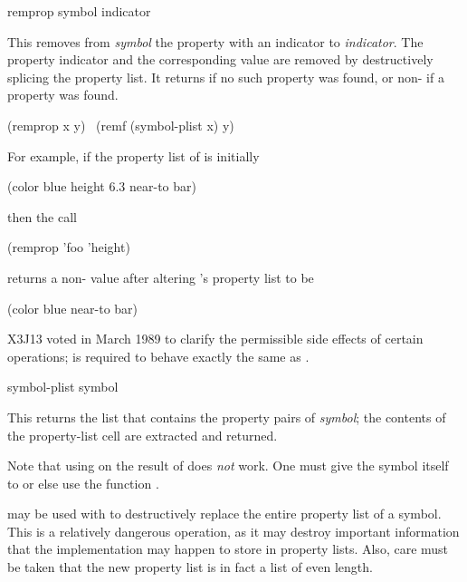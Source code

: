 \begin{defun}[Function]
remprop symbol indicator

This removes from \emph{symbol} the property with an indicator 
to \emph{indicator}.  The property indicator and the corresponding
value are removed by destructively splicing the property
list.  It returns {\false} if no such property was found,
or non-{\false} if a property was found.
\begin{lisp}
(remprop x y) \EQ\ (remf (symbol-plist x) y)
\end{lisp}
For example, if the property list of  is initially
\begin{lisp}
(color blue height 6.3 near-to bar)
\end{lisp}
then the call
\begin{lisp}
(remprop 'foo 'height)
\end{lisp}
returns a non-{\nil} value after altering 's property list to be
\begin{lisp}
(color blue near-to bar)
\end{lisp}

\begin{newer}
X3J13 voted in March 1989 
to clarify the permissible side effects of certain operations;
is required to behave exactly the same as
.
\end{newer}
\end{defun}

\begin{defun}[Function]
symbol-plist symbol

This returns the list that contains the property pairs of \emph{symbol};
the contents of the property-list cell are extracted and returned.

Note that using  on the result of  does \emph{not} work.
One must give the symbol itself to  or else
use the function .

 may be used with  to destructively replace
the entire property list of a symbol.  This is a relatively dangerous
operation, as it may destroy important information that
the implementation may happen to store in property lists.
Also, care must be taken that the new
property list is in fact a list of even length.
\end{defun}

